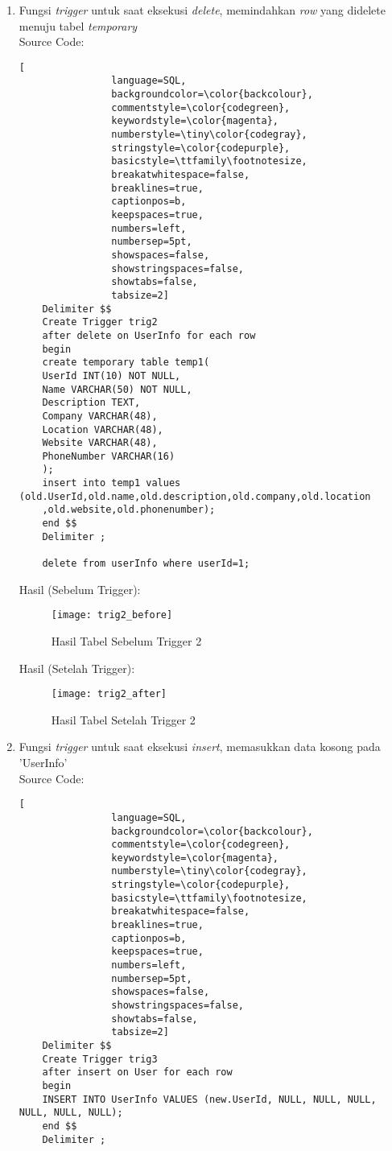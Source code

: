 \begin{enumerate}
	\item 	Fungsi \textit{trigger} untuk saat eksekusi \textit{delete}, memindahkan \textit{row} yang didelete menuju tabel \textit{temporary} \\
			Source Code:
			\begin{lstlisting}[
				language=SQL,
				backgroundcolor=\color{backcolour},   
				commentstyle=\color{codegreen},
				keywordstyle=\color{magenta},
				numberstyle=\tiny\color{codegray},
				stringstyle=\color{codepurple},
				basicstyle=\ttfamily\footnotesize,
				breakatwhitespace=false,         
				breaklines=true,                 
				captionpos=b,                    
				keepspaces=true,                 
				numbers=left,                    
				numbersep=5pt,                  
				showspaces=false,                
				showstringspaces=false,
				showtabs=false,                  
				tabsize=2]
	Delimiter $$
	Create Trigger trig2
	after delete on UserInfo for each row 
	begin
	create temporary table temp1(
	UserId INT(10) NOT NULL,
	Name VARCHAR(50) NOT NULL,
	Description TEXT,
	Company VARCHAR(48),
	Location VARCHAR(48),
	Website VARCHAR(48),
	PhoneNumber VARCHAR(16)
	);
	insert into temp1 values (old.UserId,old.name,old.description,old.company,old.location
	,old.website,old.phonenumber);
	end $$
	Delimiter ;
	
	delete from userInfo where userId=1;
			\end{lstlisting}
		Hasil (Sebelum Trigger):
		\\
		\begin{figure}[H]
			\centering
			\texttt{[image: trig2\_before]}
			\caption{Hasil Tabel Sebelum Trigger 2}
		\end{figure}
		Hasil (Setelah Trigger):
		\begin{figure}[H]
			\centering
			\texttt{[image: trig2\_after]}
			\caption{Hasil Tabel Setelah Trigger 2}
		\end{figure}
	
	\item	Fungsi \textit{trigger} untuk saat eksekusi \textit{insert}, memasukkan data kosong pada 'UserInfo' \\
			Source Code:
			\begin{lstlisting}[
				language=SQL,
				backgroundcolor=\color{backcolour},   
				commentstyle=\color{codegreen},
				keywordstyle=\color{magenta},
				numberstyle=\tiny\color{codegray},
				stringstyle=\color{codepurple},
				basicstyle=\ttfamily\footnotesize,
				breakatwhitespace=false,         
				breaklines=true,                 
				captionpos=b,                    
				keepspaces=true,                 
				numbers=left,                    
				numbersep=5pt,                  
				showspaces=false,                
				showstringspaces=false,
				showtabs=false,                  
				tabsize=2]
	Delimiter $$
	Create Trigger trig3
	after insert on User for each row 
	begin
	INSERT INTO UserInfo VALUES (new.UserId, NULL, NULL, NULL, NULL, NULL, NULL);
	end $$
	Delimiter ;
	

\end{lstlisting}
\end{enumerate}
